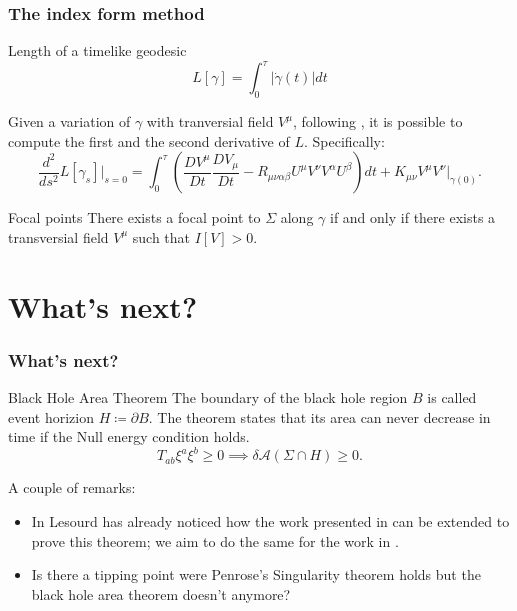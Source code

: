 \documentclass[]{beamer}
\begin{document}

\begin{frame}
	\frametitle{The index form method \cite{fewster2020new}}
	\begin{defblock}{Length of a timelike geodesic}
		\[
		L[\gamma] = \int_{0}^{\tau} |\dot{\gamma}(t)| dt
		\]
	\end{defblock}
	Given a variation of \(\gamma\) with tranversial field \(V^{\mu}\), following \cite{o1983semi}, it is possible to compute the first and the second derivative of \(L\). Specifically:
	{\small
		\[
	\frac{d^2}{ds^2}L[\gamma_s]\Bigg|_{s = 0} =\int_{0}^{\tau} \left(\frac{DV^{\mu}}{Dt} \frac{DV_{\mu}}{Dt} - R_{\mu\nu\alpha\beta}U^{\mu}V^{\nu}V^{\alpha}U^{\beta}\right) dt + K_{\mu\nu}V^{\mu}V^{\nu}|_{\gamma(0)}.
	\]}

	\begin{theoblock}{Focal points}
		There exists a focal point to \(\Sigma\) along \(\gamma\) if and only if there exists a transversial field \(V^{\mu}\) such that \(I[V] > 0\).
	\end{theoblock}
\end{frame}

\section{What's next?}
\begin{frame}
	\frametitle{What's next?}
	\begin{theoblock}{Black Hole Area Theorem}
		The boundary of the black hole region \(B\) is called event horizion \(H \coloneqq \partial B\). The theorem states that its area can never decrease in time if the Null energy condition holds.
		\[
		T_{ab}\xi^a\xi^b \ge 0 \implies \delta\mathcal{A}(\Sigma \cap H) \ge 0.
		\]
	\end{theoblock}
\pause
A couple of remarks:
\begin{itemize}
	\item<2-> In \cite{lesourd2018remark} Lesourd has already noticed how the work presented in \cite{fewster2011singularity} can be extended to prove this theorem; we aim to do the same for the work in \cite{fewster2020new}.
	\item<3-> Is there a tipping point were Penrose's Singularity theorem holds but the black hole area theorem doesn't anymore?
\end{itemize}
 
\end{frame}
\end{document}
